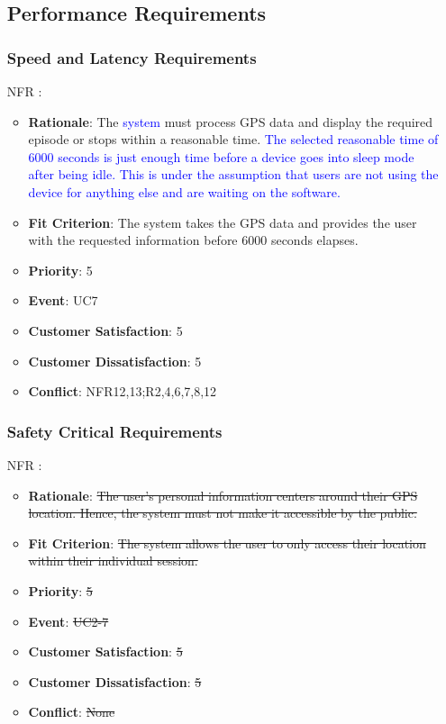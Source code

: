 \documentclass[12pt, titlepage]{article}
\newcounter{reqnum} %
\newcounter{freqnum} %
\begin{document}
\begin{itemize}
\subsection{Performance Requirements}

\subsubsection{Speed and Latency Requirements}
\item[NFR\refstepcounter{freqnum}\thefreqnum
\label{NFR}:] 
\begin{itemize}
    \item \textbf{Rationale}: The \textcolor{blue}{system} must process GPS data and display the required episode or stops within a reasonable time. \textcolor{blue}{The selected reasonable time of 6000 seconds is just enough time before a device goes into sleep mode after being idle. This is under the assumption that users are not using the device for anything else and are waiting on the software. }
    \item \textbf{Fit Criterion}: The system takes the GPS data and provides the user with the requested information before 6000 seconds elapses.
    \item \textbf{Priority}: 5
    \item \textbf{Event}: UC7 %
    \item \textbf{Customer Satisfaction}: 5
    \item \textbf{Customer Dissatisfaction}: 5
    \item \textbf{Conflict}: NFR12,13;R2,4,6,7,8,12
\end{itemize}
\subsubsection{Safety Critical Requirements}
\item[NFR\refstepcounter{freqnum}\thefreqnum
\label{NFR}:] 
\begin{itemize}
    \item \textbf{Rationale}: \sout{The user's personal information centers around their GPS location. Hence, the system must not make it accessible by the public.}
    \item \textbf{Fit Criterion}: \sout{The system allows the user to only access their location within their individual session.}
    \item \textbf{Priority}: \sout{5}
    \item \textbf{Event}: \sout{UC2-7}%
    \item \textbf{Customer Satisfaction}: \sout{5}
    \item \textbf{Customer Dissatisfaction}: \sout{5}
    \item \textbf{Conflict}: \sout{None}
\end{itemize}

\end{itemize}
\end{document}
